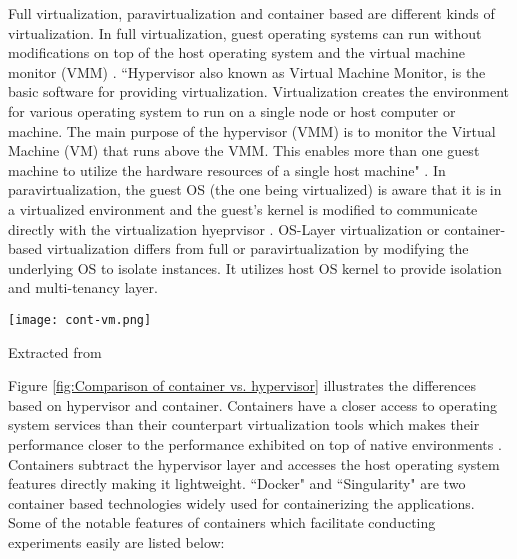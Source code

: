 Full virtualization, paravirtualization and container based are different kinds of virtualization. In full virtualization, guest operating systems can run without modifications on top of the host operating system and the virtual machine monitor (VMM) \cite{7382987}. ``Hypervisor also known as Virtual Machine Monitor, is the basic software for providing virtualization. Virtualization creates the environment for various operating system to run on a single node or host computer or machine. The main purpose of the hypervisor (VMM) is to monitor the Virtual Machine (VM) that runs above the VMM. This enables more than one guest machine to utilize the hardware resources of a single host machine" \cite{hypervisor}. In paravirtualization, the guest OS (the one being virtualized) is aware that it is in a virtualized environment and the guest's kernel is modified to communicate directly with the virtualization hyeprvisor \cite{7382987}. OS-Layer virtualization or container-based virtualization differs from full or paravirtualization by modifying the underlying OS to isolate instances. It utilizes host OS kernel to provide isolation and multi-tenancy layer.

\begin{center}
\texttt{[image: cont-vm.png]}
\label{fig:Comparison of container vs. hypervisor}
\caption*{Extracted from \cite{7382987}}
\end{center}

Figure \ref{fig:Comparison of container vs. hypervisor} illustrates the differences based on hypervisor and container. Containers have a closer access to operating system services than their counterpart virtualization tools which makes their performance closer to the performance exhibited on top of native environments \cite{Xavier:2013:PEC:2497369.2497577}. Containers subtract the hypervisor layer and accesses the host operating system features directly making it lightweight. ``Docker" and ``Singularity" are two container based technologies widely used for containerizing the applications.\\

Some of the notable features of containers \cite{docker-run} \cite{DBLP:journals/corr/HaleLRW16} \cite{Julian:2016:CRI:2949550.2949562} \cite{10.1109/ISPASS.2015.7095802} which facilitate conducting experiments easily are listed below:

